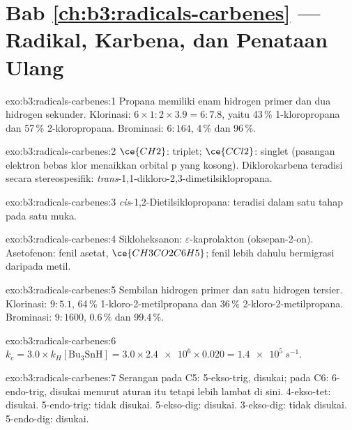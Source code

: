 \section*{Bab \ref{ch:b3:radicals-carbenes} --- Radikal, Karbena, dan Penataan Ulang}

\begin{solution}{exo:b3:radicals-carbenes:1}
Propana memiliki enam hidrogen primer dan dua hidrogen sekunder. Klorinasi: $6 \times 1 : 2 \times 3.9 = 6 : 7.8$,
yaitu 43\,\% 1-kloropropana dan 57\,\% 2-kloropropana. Brominasi: $6 : 164$, 4\,\% dan
96\,\%.
\end{solution}

\begin{solution}{exo:b3:radicals-carbenes:2}
$\ce{CH2}$: triplet; $\ce{CCl2}$: singlet (pasangan elektron bebas klor menaikkan orbital p yang kosong).
Diklorokarbena teradisi secara stereospesifik: \textit{trans}-1,1-dikloro-2,3-dimetilsiklopropana.
\end{solution}

\begin{solution}{exo:b3:radicals-carbenes:3}
\textit{cis}-1,2-Dietilsiklopropana:  teradisi dalam satu tahap pada satu muka.
\end{solution}

\begin{solution}{exo:b3:radicals-carbenes:4}
Sikloheksanon: $\varepsilon$-kaprolakton (oksepan-2-on). Asetofenon: fenil asetat,
$\ce{CH3CO2C6H5}$; fenil lebih dahulu bermigrasi daripada metil.
\end{solution}

\begin{solution}{exo:b3:radicals-carbenes:5}
Sembilan hidrogen primer dan satu hidrogen tersier. Klorinasi: $9 : 5.1$, 64\,\% 1-kloro-2-metilpropana
dan 36\,\% 2-kloro-2-metilpropana. Brominasi: $9 : 1600$, 0.6\,\% dan 99.4\,\%.
\end{solution}

\begin{solution}{exo:b3:radicals-carbenes:6}
$k_c = 3.0 \times k_H[\mathrm{Bu_3SnH}] = 3.0 \times \num{2.4e6} \times 0.020 = \qty{1.4e5}{s^{-1}}$.
\end{solution}

\begin{solution}{exo:b3:radicals-carbenes:7}
Serangan pada C5: 5-ekso-trig, disukai; pada C6: 6-endo-trig, disukai menurut aturan itu tetapi
lebih lambat di sini. 4-ekso-tet: disukai. 5-endo-trig: tidak disukai. 5-ekso-dig: disukai.
3-ekso-dig: tidak disukai. 5-endo-dig: disukai.
\end{solution}

